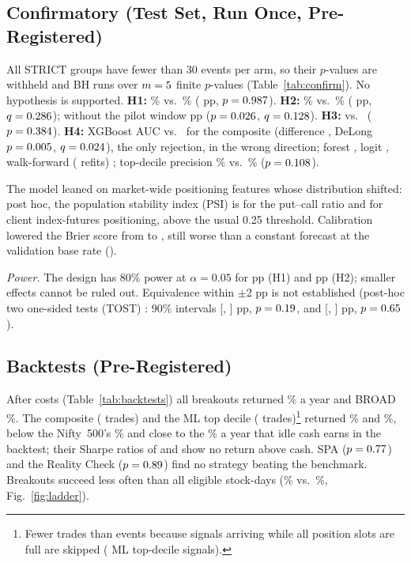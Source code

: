 \documentclass[conference]{IEEEtran}
\begin{document}
\subsection{Confirmatory (Test Set, Run Once, Pre-Registered)}
All STRICT groups have fewer than 30 events per arm, so their $p$-values are withheld and BH runs over
$m=5$ finite $p$-values (Table~\ref{tab:confirm}). No hypothesis is supported. \textbf{H1:} \HOneExp\% vs.\
\HOneRest\% (\HOneDiff{} pp, $p=0.987$). \textbf{H2:} \HTwoExp\% vs.\ \HTwoRest\% (\HTwoDiff{} pp,
$q=0.286$); without the pilot window \NPHTwoDiff{} pp ($p=0.026$, $q=0.128$). \textbf{H3:}
\HThreeExp{} vs.\ \HThreeRest{} ($p=0.384$). \textbf{H4:} XGBoost AUC \AUCxgb{} vs.\ \AUCcomp{} for the
composite (difference \HFourDiff, DeLong $p=0.005$, $q=0.024$), the only rejection, in the wrong
direction; forest \AUCrf, logit \AUClogit, walk-forward (\WFMonths{} refits) \WFAUC; top-decile precision
\TopMLPrec\% vs.\ \TopCompPrec\% ($p=0.108$).

The model leaned on market-wide positioning features whose distribution shifted: post hoc, the population
stability index (PSI) is \PSIpcr{} for the put--call ratio and \PSIclient{} for client index-futures
positioning, above the usual 0.25 threshold. Calibration lowered the Brier score \cite{brier1950} from
\BrierRaw{} to \BrierCal, still worse than a constant forecast at the validation base rate (\BrierConstVal).

\emph{Power.} The design has 80\% power at $\alpha=0.05$ for \MDEHOne{} pp (H1) and \MDEHTwo{} pp (H2);
smaller effects cannot be ruled out. Equivalence within $\pm$2 pp is not established (post-hoc two one-sided
tests (TOST) \cite{lakens2017}: 90\% intervals [\TostHOneLo, \TostHOneHi] pp, $p=0.19$, and
[\TostHTwoLo, \TostHTwoHi] pp, $p=0.65$).



\subsection{Backtests (Pre-Registered)}
After costs (Table~\ref{tab:backtests}) all breakouts returned \CagrAll\% a year and BROAD \CagrBroad\%. The
composite (\TradesComp{} trades) and the ML top decile (\TradesML{} trades)\footnote{Fewer trades than events
because signals arriving while all \MaxPositions{} position slots are full are skipped (\GapSlotsFull{} ML
top-decile signals).} returned \CagrComp\% and \CagrML\%, below the Nifty~500's \CagrNifty\% and close to the
\CashRate\% a year that idle cash earns in the backtest; their Sharpe ratios of \SharpeComp{} and
\SharpeML{} show no return above cash. SPA ($p=0.77$) and the Reality Check ($p=0.89$) find no strategy
beating the benchmark. Breakouts succeed less often than all eligible stock-days (\LadAll\% vs.\ \LadBase\%,
Fig.~\ref{fig:ladder}).
\end{document}
